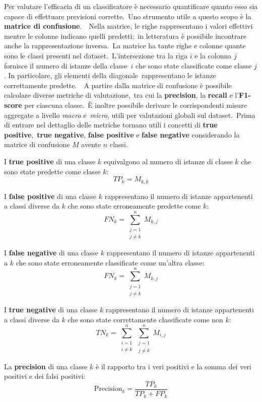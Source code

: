 Per valutare l'efficacia di un classificatore è necessario quantificare quanto esso sia capace di effettuare previsioni corrette.\
Uno strumento utile a questo scopo è la \textbf{matrice di confusione}.\
\
Nella matrice, le righe rappresentano i valori effettivi mentre le colonne indicano quelli predetti;\
in letteratura è possibile incontrare anche la rappresentazione inversa.\
La matrice ha tante righe e colonne quante sono le classi presenti nel dataset.\
L'intersezione tra la riga $i$ e la colonna $j$ fornisce il numero di istanze della classe\
$i$ che sono state classificate come classe $j$. In particolare, gli elementi della diagonale\
rappresentano le istanze correttamente predette.\
\
A partire dalla matrice di confusione è possibile calcolare diverse metriche di valutazione,\
tra cui la \textbf{precision}, la \textbf{recall} e l'\textbf{F1-score} per ciascuna classe.\
È inoltre possibile derivare le corrispondenti misure aggregate a livello \textit{macro} e\
\textit{micro}, utili per valutazioni globali sul dataset.\
Prima di entrare nel dettaglio delle metriche tornano utili i concetti di \textbf{true positive},\
\textbf{true negative}, \textbf{false positive} e \textbf{false negative} considerando la matrice di confusione $M$ avente $n$ classi.

I \textbf{true positive} di una classe $k$ equivalgono al numero di istanze di classe $k$ che
sono state predette come classe $k$:
\[
      TP_{k} = M_{k,k}
\]

I \textbf{false positive} di una classe $k$ rappresentano il numero di istanze appartenenti a
classi diverse da $k$ che sono state erroneamente predette come $k$:
\[
      FN_{k} = \sum_{\substack{j=1 \\ j \neq k}}^{n} M_{k,j}
\]

I \textbf{false negative} di una classe $k$ rappresentano il numero di istanze appartenenti a
$k$ che sono state erroneamente classificate come un'altra classe:
\[
      FN_{k} = \sum_{\substack{j=1 \\ j \neq k}}^{n} M_{k,j}
\]

I \textbf{true negative} di una classe $k$ rappresentano il numero di istanze appartenenti a
classi diverse da $k$ che sono state correttamente classificate come non $k$:
\[
      TN_{k} = \sum_{\substack{i=1 \\ i \neq k}}^{n}
      \sum_{\substack{j=1 \\ j \neq k}}^{n} M_{i,j}
\]

La \textbf{precision} di una classe $k$ è il rapporto tra i veri positivi e la
somma dei veri positivi e dei falsi positivi:
\[
      \mathrm{Precision}_k = \frac{TP_k}{TP_k + FP_k}
\]


